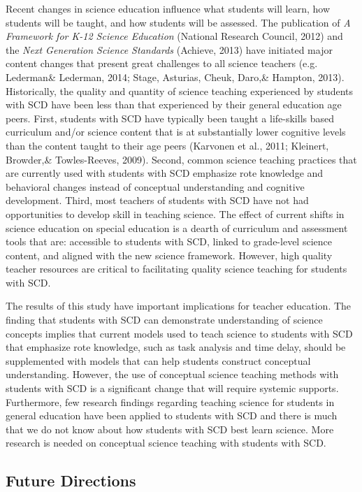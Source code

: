 \documentclass[11.5pt]{sig-alternate} %
\begin{document}
\begin{large}
Recent changes in science education influence what students will learn, how students will be taught, and how students will be assessed. The publication of \textit{A Framework for K-12 Science Education} (National Research Council, 2012) and the \textit{Next Generation Science Standards} (A\-chieve, 2013) have initiated major content changes that present great challenges to all science teachers (e.g. Lederman\& Lederman, 2014; Stage, Asturias, Cheuk, Daro,\& Hampton, 2013). Historically, the quality and quantity of science teaching experienced by students with SCD have been less than that experienced by their general education age peers. First, students with SCD have typically been taught a life-skills based curriculum and/or science content that is at substantially lower cognitive levels than the content taught to their age peers (Karvonen et al., 2011; Kleinert, Browder,\& Towles-Reeves, 2009).  Second, common science teaching practices that are currently used with students with SCD emphasize rote knowledge and behavioral changes instead of conceptual understanding and cognitive development. Third, most teachers of students with SCD have not had opportunities to develop skill in teaching science. The effect of current shifts in science education on special education is a dearth of curriculum and assessment tools that are: accessible to students with SCD, linked to grade-level science content, and aligned with the new science framework. However, high quality teacher resources are critical to facilitating quality science teaching for students with SCD.

The results of this study have important implications for teacher education. The finding that students with SCD can demonstrate understanding of science concepts implies that current models used to teach science to students with SCD that emphasize rote knowledge, such as task analysis and time delay, should be supplemented with models that can help students construct conceptual understanding.  However, the use of conceptual science teaching methods with students with SCD is a significant change that will require systemic supports. Furthermore, few research findings regarding teaching science for students in general education have been applied to students with SCD and there is much that we do not know about how students with SCD best learn science. More research is needed on conceptual science teaching with students with SCD.

\subsection*{Future Directions}


\end{large}
\end{document}
